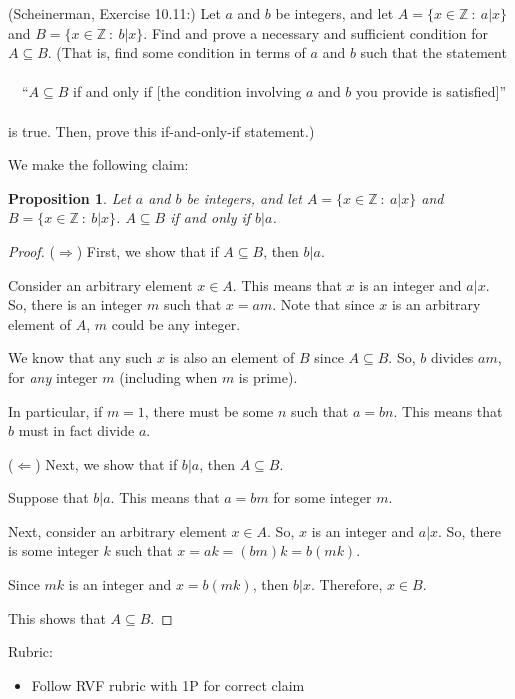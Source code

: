 \documentclass{article}
\newcommand{\Z}{\mathbb{Z}}
\newtheorem*{proposition}{Proposition}
\theoremstyle{definition}
\begin{document}
\begin{question}
   (Scheinerman, Exercise 10.11:)
   Let $a$ and $b$ be integers, and let $A = \{x \in \Z ~:~ a|x\}$ and $B = \{ x\in\Z ~:~ b|x\}$.  
   Find and prove a necessary and sufficient condition for $A \subseteq B$.
   (That is, find some condition in terms of $a$ and $b$ such that the statement\\~\\
   $~~~$ ``$A \subseteq B$ if and only if [the condition involving $a$ and $b$ you provide is satisfied]''\\~\\
   is true.  Then, prove this if-and-only-if statement.)
\end{question}
\begin{solution}
We make the following claim:
\begin{proposition}
Let $a$ and $b$ be integers, and let $A = \{x \in \Z ~:~ a|x\}$ and $B = \{ x\in\Z ~:~ b|x\}$.  
$A \subseteq B$ if and only if $b|a$.
\end{proposition}
\begin{proof}
($\Rightarrow$) First, we show that if $A\subseteq B$, then $b|a$.

Consider an arbitrary element $x \in A$.  This means that $x$ is an integer and $a|x$.  So, there is an integer $m$ such that $x = am$.  Note that since $x$ is an arbitrary element of $A$, $m$ could be any integer.

We know that any such $x$ is also an element of $B$ since $A \subseteq B$.  So, $b$ divides $am$, for \emph{any} integer $m$ (including when $m$ is prime).

In particular, if $m = 1$, there must be some $n$ such that $a = bn$.  This means that $b$ must in fact divide $a$.

($\Leftarrow$) Next, we show that if $b|a$, then $A\subseteq B$.

Suppose that $b |a$.  This means that $a = bm$ for some integer $m$.

Next, consider an arbitrary element $x \in A$.  So, $x$ is an integer and $a|x$.  So, there is some integer $k$ such that $x = ak = (bm)k = b(mk)$.

Since $mk$ is an integer and $x = b(mk)$, then $b|x$.  Therefore, $x \in B$.

This shows that $A \subseteq B$.
\end{proof}
{\color{red} Rubric:
\begin{itemize}
\item Follow RVF rubric with 1P for correct claim
\end{itemize}}
\end{solution}
\end{document}
